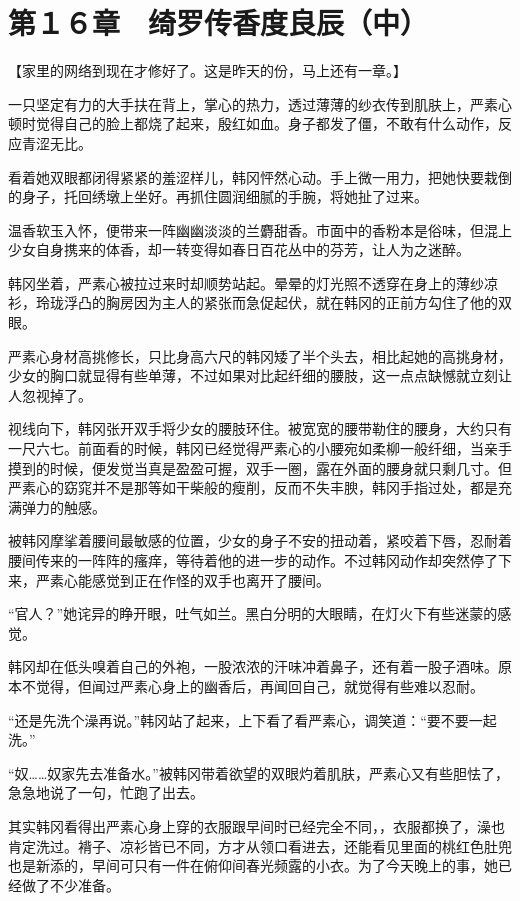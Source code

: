 \section{第１６章　绮罗传香度良辰（中）}

【家里的网络到现在才修好了。这是昨天的份，马上还有一章。】

一只坚定有力的大手扶在背上，掌心的热力，透过薄薄的纱衣传到肌肤上，严素心顿时觉得自己的脸上都烧了起来，殷红如血。身子都发了僵，不敢有什么动作，反应青涩无比。

看着她双眼都闭得紧紧的羞涩样儿，韩冈怦然心动。手上微一用力，把她快要栽倒的身子，托回绣墩上坐好。再抓住圆润细腻的手腕，将她扯了过来。

温香软玉入怀，便带来一阵幽幽淡淡的兰麝甜香。市面中的香粉本是俗味，但混上少女自身携来的体香，却一转变得如春日百花丛中的芬芳，让人为之迷醉。

韩冈坐着，严素心被拉过来时却顺势站起。晕晕的灯光照不透穿在身上的薄纱凉衫，玲珑浮凸的胸房因为主人的紧张而急促起伏，就在韩冈的正前方勾住了他的双眼。

严素心身材高挑修长，只比身高六尺的韩冈矮了半个头去，相比起她的高挑身材，少女的胸口就显得有些单薄，不过如果对比起纤细的腰肢，这一点点缺憾就立刻让人忽视掉了。

视线向下，韩冈张开双手将少女的腰肢环住。被宽宽的腰带勒住的腰身，大约只有一尺六七。前面看的时候，韩冈已经觉得严素心的小腰宛如柔柳一般纤细，当亲手摸到的时候，便发觉当真是盈盈可握，双手一圈，露在外面的腰身就只剩几寸。但严素心的窈窕并不是那等如干柴般的瘦削，反而不失丰腴，韩冈手指过处，都是充满弹力的触感。

被韩冈摩挲着腰间最敏感的位置，少女的身子不安的扭动着，紧咬着下唇，忍耐着腰间传来的一阵阵的瘙痒，等待着他的进一步的动作。不过韩冈动作却突然停了下来，严素心能感觉到正在作怪的双手也离开了腰间。

“官人？”她诧异的睁开眼，吐气如兰。黑白分明的大眼睛，在灯火下有些迷蒙的感觉。

韩冈却在低头嗅着自己的外袍，一股浓浓的汗味冲着鼻子，还有着一股子酒味。原本不觉得，但闻过严素心身上的幽香后，再闻回自己，就觉得有些难以忍耐。

“还是先洗个澡再说。”韩冈站了起来，上下看了看严素心，调笑道：“要不要一起洗。”

“奴……奴家先去准备水。”被韩冈带着欲望的双眼灼着肌肤，严素心又有些胆怯了，急急地说了一句，忙跑了出去。

其实韩冈看得出严素心身上穿的衣服跟早间时已经完全不同，，衣服都换了，澡也肯定洗过。褙子、凉衫皆已不同，方才从领口看进去，还能看见里面的桃红色肚兜也是新添的，早间可只有一件在俯仰间春光频露的小衣。为了今天晚上的事，她已经做了不少准备。

